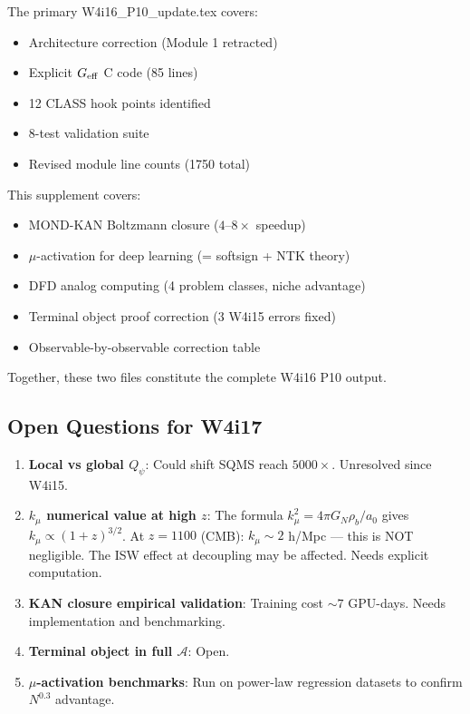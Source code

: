\documentclass[11pt]{article}
\theoremstyle{definition}
\theoremstyle{remark}
\begin{document}
The primary W4i16\_P10\_update.tex covers:
\begin{itemize}[nosep]
\item Architecture correction (Module 1 retracted)
\item Explicit $G_{\rm eff}$ C code (85 lines)
\item 12 CLASS hook points identified
\item 8-test validation suite
\item Revised module line counts (1750 total)
\end{itemize}

This supplement covers:
\begin{itemize}[nosep]
\item MOND-KAN Boltzmann closure ($4$--$8\times$ speedup)
\item $\mu$-activation for deep learning (= softsign + NTK theory)
\item DFD analog computing (4 problem classes, niche advantage)
\item Terminal object proof correction (3 W4i15 errors fixed)
\item Observable-by-observable correction table
\end{itemize}

Together, these two files constitute the complete W4i16 P10 output.

\subsection{Open Questions for W4i17}

\begin{enumerate}
\item \textbf{Local vs global $Q_\psi$}: Could shift SQMS reach $5000\times$.
  Unresolved since W4i15.
\item \textbf{$k_\mu$ numerical value at high $z$}: The formula
  $k_\mu^2 = 4\pi G_N\rho_b/a_0$ gives $k_\mu \propto (1+z)^{3/2}$.
  At $z = 1100$ (CMB): $k_\mu \sim 2$ h/Mpc --- this is NOT negligible.
  The ISW effect at decoupling may be affected. Needs explicit computation.
\item \textbf{KAN closure empirical validation}: Training cost $\sim 7$
  GPU-days. Needs implementation and benchmarking.
\item \textbf{Terminal object in full $\mathcal{A}$}: Open.
\item \textbf{$\mu$-activation benchmarks}: Run on power-law regression
  datasets to confirm $N^{0.3}$ advantage.
\end{enumerate}
\end{document}
